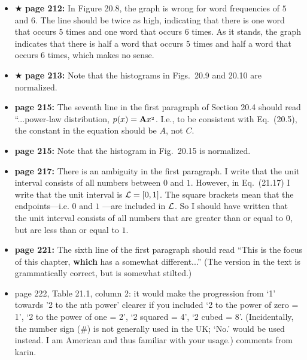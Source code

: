 \documentclass[12pt]{article}
\begin{document}
\begin{itemize}
  \item $\bigstar$ {\bf page 212:} In Figure 20.8, the graph is wrong
    for word frequencies of $5$ and $6$.  The line should be twice as
    high, indicating that there is one word that occurs $5$ times and
    one word that occurs $6$ times.  As it stands, the graph indicates
    that there is half a word that occurs $5$ times and half a word
    that occurs $6$ times, which makes no sense. 

  \item $\bigstar$ {\bf page 213:}  Note that the histograms in
    Figs.~20.9 and 20.10 are normalized.  


  \item {\bf page 215:}  The seventh line in the first paragraph of
    Section 20.4 should read ``...power-law distribution, $p(x) = {\bf
      A}x^{_2}$.  I.e., to be consistent with Eq.~(20.5), the constant
    in the equation should be $A$, not $C$. 

  \item {\bf page 215:}  Note that the histogram in Fig.~20.15 is
    normalized. 

  \item {\bf page 217:}  There is an ambiguity in the first
    paragraph.  I write that the unit interval consists of all
    numbers between $0$ and $1$.  However, in Eq.~(21.17) I write that
    the unit interval is ${\cal L} = [0,1]$.  The square brackets mean
    that the endpoints---i.e. $0$ and $1$ ---are included in ${\cal
      L}$.  So I should have written that the unit interval consists
    of all numbers that are greater than or equal to $0$, but are less
    than or equal to $1$.  

  \item {\bf page 221:}  The sixth line of the first paragraph should
    read ``This is the focus of this chapter, {\bf which} has a
    somewhat different...''  (The version in the text is grammatically
    correct, but is somewhat stilted.) 

  \item page 222, Table 21.1, column 2:  it would make the progression from
  ‘1’ towards '2 to the nth power' clearer if you included ‘2 to
  the power of zero = 1’, ‘2 to the power of one = 2’, ‘2 squared
  = 4’, ‘2 cubed = 8’.  (Incidentally, the number sign (\#) is not
  generally used in the UK; ‘No.’ would be used instead.  I am
  American and thus familiar with your usage.)  comments from karin. 


\end{itemize}
\end{document}

